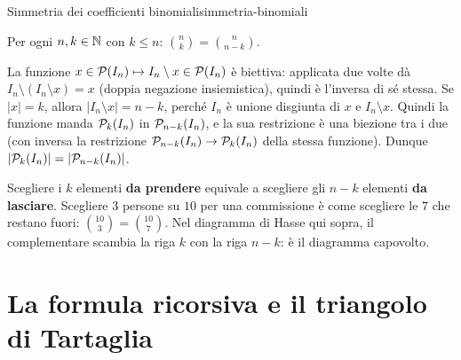 \begin{concetto}
\begin{Teorema}{Simmetria dei coefficienti binomiali}{simmetria-binomiali}
    \begin{prerequisiti}
    \end{prerequisiti}
    Per ogni $n, k \in \mathbb{N}$ con $k \leq n$: \quad $\displaystyle\binom{n}{k} = \binom{n}{n - k}$.
\end{Teorema}
\begin{dimostrazione}
    La funzione $x \in \mathcal{P}(I_n) \mapsto I_n \setminus x \in \mathcal{P}(I_n)$ è biettiva: applicata due volte dà $I_n \setminus (I_n \setminus x) = x$ (doppia
    negazione insiemistica), quindi è l'inversa di sé stessa. Se $|x| = k$, allora $|I_n \setminus x| = n - k$, perché $I_n$ è unione disgiunta di
    $x$ e $I_n \setminus x$. Quindi la funzione manda $\mathcal{P}_k(I_n)$ in $\mathcal{P}_{n - k}(I_n)$, e la sua restrizione è una biezione tra i due
    (con inversa la restrizione $\mathcal{P}_{n - k}(I_n) \to \mathcal{P}_k(I_n)$ della stessa funzione). Dunque $|\mathcal{P}_k(I_n)| = |\mathcal{P}_{n - k}(I_n)|$.
\end{dimostrazione}
\end{concetto}

\begin{spiegazione}
    Scegliere i $k$ elementi \textbf{da prendere} equivale a scegliere gli $n - k$ elementi \textbf{da lasciare}. Scegliere $3$ persone su
    $10$ per una commissione è come scegliere le $7$ che restano fuori: $\binom{10}{3} = \binom{10}{7}$. Nel diagramma di Hasse qui sopra,
    il complementare scambia la riga $k$ con la riga $n - k$: è il diagramma capovolto.
\end{spiegazione}

\section{La formula ricorsiva e il triangolo di Tartaglia}\label{sec:tartaglia}

